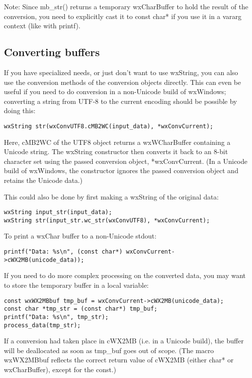 Note: Since mb\_str() returns a temporary wxCharBuffer to hold the result
of the conversion, you need to explicitly cast it to const char* if you use
it in a vararg context (like with printf).

\subsection{Converting buffers}

If you have specialized needs, or just don't want to use wxString, you
can also use the conversion methods of the conversion objects directly.
This can even be useful if you need to do conversion in a non-Unicode
build of wxWindows; converting a string from UTF-8 to the current
encoding should be possible by doing this:

\begin{verbatim}
wxString str(wxConvUTF8.cMB2WC(input_data), *wxConvCurrent);
\end{verbatim}

Here, cMB2WC of the UTF8 object returns a wxWCharBuffer containing a Unicode
string. The wxString constructor then converts it back to an 8-bit character
set using the passed conversion object, *wxConvCurrent. (In a Unicode build
of wxWindows, the constructor ignores the passed conversion object and
retains the Unicode data.)

This could also be done by first making a wxString of the original data:

\begin{verbatim}
wxString input_str(input_data);
wxString str(input_str.wc_str(wxConvUTF8), *wxConvCurrent);
\end{verbatim}

To print a wxChar buffer to a non-Unicode stdout:

\begin{verbatim}
printf("Data: %s\n", (const char*) wxConvCurrent->cWX2MB(unicode_data));
\end{verbatim}

If you need to do more complex processing on the converted data, you
may want to store the temporary buffer in a local variable:

\begin{verbatim}
const wxWX2MBbuf tmp_buf = wxConvCurrent->cWX2MB(unicode_data);
const char *tmp_str = (const char*) tmp_buf;
printf("Data: %s\n", tmp_str);
process_data(tmp_str);
\end{verbatim}

If a conversion had taken place in cWX2MB (i.e. in a Unicode build),
the buffer will be deallocated as soon as tmp\_buf goes out of scope.
(The macro wxWX2MBbuf reflects the correct return value of cWX2MB
(either char* or wxCharBuffer), except for the const.)


